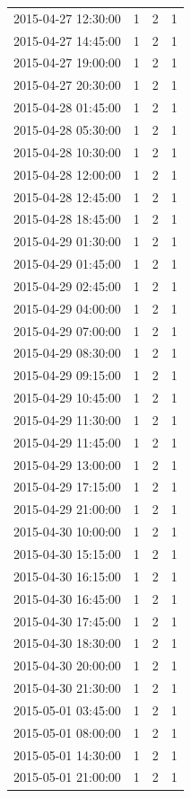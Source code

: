 \begin{tabular}{lrrr}
2015-04-27 12:30:00 & 1 & 2 & 1 \\
2015-04-27 14:45:00 & 1 & 2 & 1 \\
2015-04-27 19:00:00 & 1 & 2 & 1 \\
2015-04-27 20:30:00 & 1 & 2 & 1 \\
2015-04-28 01:45:00 & 1 & 2 & 1 \\
2015-04-28 05:30:00 & 1 & 2 & 1 \\
2015-04-28 10:30:00 & 1 & 2 & 1 \\
2015-04-28 12:00:00 & 1 & 2 & 1 \\
2015-04-28 12:45:00 & 1 & 2 & 1 \\
2015-04-28 18:45:00 & 1 & 2 & 1 \\
2015-04-29 01:30:00 & 1 & 2 & 1 \\
2015-04-29 01:45:00 & 1 & 2 & 1 \\
2015-04-29 02:45:00 & 1 & 2 & 1 \\
2015-04-29 04:00:00 & 1 & 2 & 1 \\
2015-04-29 07:00:00 & 1 & 2 & 1 \\
2015-04-29 08:30:00 & 1 & 2 & 1 \\
2015-04-29 09:15:00 & 1 & 2 & 1 \\
2015-04-29 10:45:00 & 1 & 2 & 1 \\
2015-04-29 11:30:00 & 1 & 2 & 1 \\
2015-04-29 11:45:00 & 1 & 2 & 1 \\
2015-04-29 13:00:00 & 1 & 2 & 1 \\
2015-04-29 17:15:00 & 1 & 2 & 1 \\
2015-04-29 21:00:00 & 1 & 2 & 1 \\
2015-04-30 10:00:00 & 1 & 2 & 1 \\
2015-04-30 15:15:00 & 1 & 2 & 1 \\
2015-04-30 16:15:00 & 1 & 2 & 1 \\
2015-04-30 16:45:00 & 1 & 2 & 1 \\
2015-04-30 17:45:00 & 1 & 2 & 1 \\
2015-04-30 18:30:00 & 1 & 2 & 1 \\
2015-04-30 20:00:00 & 1 & 2 & 1 \\
2015-04-30 21:30:00 & 1 & 2 & 1 \\
2015-05-01 03:45:00 & 1 & 2 & 1 \\
2015-05-01 08:00:00 & 1 & 2 & 1 \\
2015-05-01 14:30:00 & 1 & 2 & 1 \\
2015-05-01 21:00:00 & 1 & 2 & 1 \\

\end{tabular}
